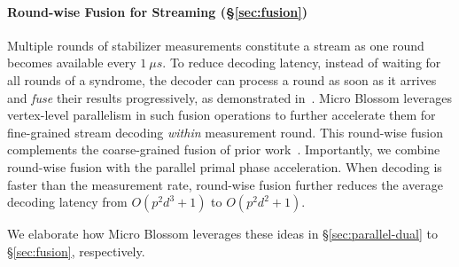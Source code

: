 \paragraph{Round-wise Fusion for Streaming (\S\ref{sec:fusion})}

Multiple rounds of stabilizer measurements constitute a stream as one round becomes available every $\qty{1}{\mu s}$.
To reduce decoding latency, instead of waiting for all rounds of a syndrome, the decoder can process a round as soon as it arrives and \emph{fuse} their results progressively, as demonstrated in~\cite{wu2023qce}.
Micro Blossom leverages vertex-level parallelism in such fusion operations to further accelerate them for fine-grained stream decoding \emph{within} measurement round.
This round-wise fusion complements the coarse-grained fusion of prior work~\cite{wu2023qce}.
Importantly, we combine round-wise fusion with the parallel primal phase acceleration.
When decoding is faster than the measurement rate, round-wise fusion further reduces the average decoding latency from $O(p^2 d^3 + 1)$ to $O(p^2 d^2 + 1)$.

\smallskip

We elaborate how Micro Blossom leverages these ideas in \S\ref{sec:parallel-dual} to \S\ref{sec:fusion}, respectively.
